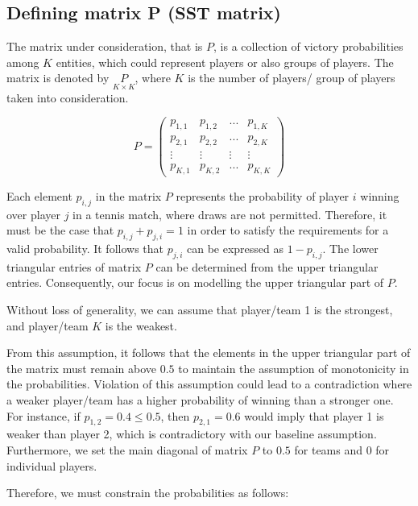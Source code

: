 \documentclass[11pt]{amsart}
\begin{document}
\subsection{Defining matrix P (SST matrix)}
The matrix under consideration, that is $P$, is a collection of victory probabilities among $K$ entities, which could represent players or also groups of players. The matrix is denoted by $\underset{K \times K}{P}$, where $K$ is the number of players/ group of players taken into consideration. 

\begin{center}
$$P = 
\left(\begin{array}{cccc}p_{1,1} & p_{1,2} &  ... & p_{1,K} \\ p_{2,1} & p_{2,2} & ... & p_{2,K} \\ \vdots & \vdots & \vdots & \vdots \\ p_{K,1}& p_{K,2 }& ... & p_{K,K}\end{array}\right)$$
\end{center}



Each element $p_{i,j}$ in the matrix $P$ represents the probability of player $i$ winning over player $j$ in a tennis match, where draws are not permitted. Therefore, it must be the case that $p_{i,j} + p_{j,i} = 1$ in order to satisfy the requirements for a valid probability. It follows that $p_{j,i}$ can be expressed as $1 - p_{i,j}$. The lower triangular entries of matrix $P$ can be determined from the upper triangular entries. Consequently, our focus is on modelling the upper triangular part of $P$.
 
Without loss of generality, we can assume that player/team 1 is the strongest, and player/team $K$ is the weakest.

From this assumption, it follows that the elements in the upper triangular part of the matrix must remain above $0.5$ to maintain the assumption of monotonicity in the probabilities. Violation of this assumption could lead to a contradiction where a weaker player/team has a higher probability of winning than a stronger one. For instance, if $p_{1,2} = 0.4 \leq 0.5$, then $p_{2,1} = 0.6$ would imply that player 1 is weaker than player 2, which is contradictory with our baseline assumption. Furthermore, we set the main diagonal of matrix $P$ to $0.5$ for teams and $0$ for individual players.

Therefore, we must constrain the probabilities as follows:
\end{document}
